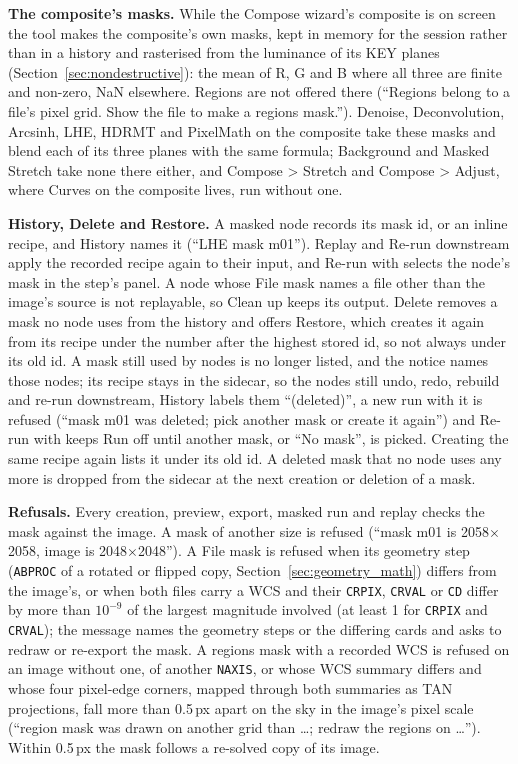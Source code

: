 \documentclass[11pt,a4paper]{article}
\newcommand{\code}[1]{\texttt{\small #1}}
\begin{document}
    \textbf{The composite's masks.} While the Compose wizard's composite is on screen the tool makes the composite's own masks, kept in memory for the session rather than in a history and rasterised from the luminance of its KEY planes (Section~\ref{sec:nondestructive}): the mean of R, G and B where all three are finite and non-zero, NaN elsewhere. Regions are not offered there (``Regions belong to a file's pixel grid. Show the file to make a regions mask.''). Denoise, Deconvolution, Arcsinh, LHE, HDRMT and PixelMath on the composite take these masks and blend each of its three planes with the same formula; Background and Masked Stretch take none there either, and Compose \textgreater{} Stretch and Compose \textgreater{} Adjust, where Curves on the composite lives, run without one.

    \textbf{History, Delete and Restore.} A masked node records its mask id, or an inline recipe, and History names it (``LHE \textperiodcentered{} mask m01''). Replay and Re-run downstream apply the recorded recipe again to their input, and Re-run with selects the node's mask in the step's panel. A node whose File mask names a file other than the image's source is not replayable, so Clean up keeps its output. Delete removes a mask no node uses from the history and offers Restore, which creates it again from its recipe under the number after the highest stored id, so not always under its old id. A mask still used by nodes is no longer listed, and the notice names those nodes; its recipe stays in the sidecar, so the nodes still undo, redo, rebuild and re-run downstream, History labels them ``(deleted)'', a new run with it is refused (``mask m01 was deleted; pick another mask or create it again'') and Re-run with keeps Run off until another mask, or ``No mask'', is picked. Creating the same recipe again lists it under its old id. A deleted mask that no node uses any more is dropped from the sidecar at the next creation or deletion of a mask.

    \textbf{Refusals.} Every creation, preview, export, masked run and replay checks the mask against the image. A mask of another size is refused (``mask m01 is 2058$\times$2058, image is 2048$\times$2048''). A File mask is refused when its geometry step (\code{ABPROC} of a rotated or flipped copy, Section~\ref{sec:geometry_math}) differs from the image's, or when both files carry a WCS and their \code{CRPIX}, \code{CRVAL} or \code{CD} differ by more than $10^{-9}$ of the largest magnitude involved (at least 1 for \code{CRPIX} and \code{CRVAL}); the message names the geometry steps or the differing cards and asks to redraw or re-export the mask. A regions mask with a recorded WCS is refused on an image without one, of another \code{NAXIS}, or whose WCS summary differs and whose four pixel-edge corners, mapped through both summaries as TAN projections, fall more than 0.5\,px apart on the sky in the image's pixel scale (``region mask was drawn on another grid than \ldots{}; redraw the regions on \ldots''). Within 0.5\,px the mask follows a re-solved copy of its image.
\end{document}
